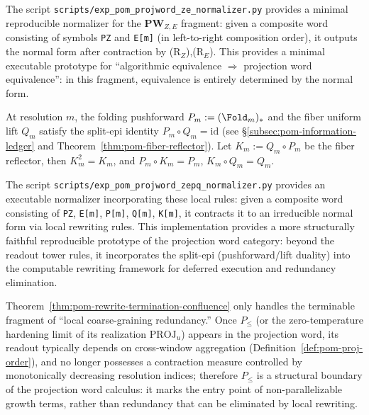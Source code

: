 \begin{remark}\label{rem:pom-projword-normalizer-script}
The script \texttt{scripts/exp\_pom\_projword\_ze\_normalizer.py} provides a minimal reproducible normalizer for the $\mathbf{PW}_{Z,E}$ fragment: given a composite word consisting of symbols \texttt{PZ} and \texttt{E[m]} (in left-to-right composition order), it outputs the normal form after contraction by (R$_Z$),(R$_E$).
This provides a minimal executable prototype for ``algorithmic equivalence \(\Rightarrow\) projection word equivalence'': in this fragment, equivalence is entirely determined by the normal form.
\end{remark}

\begin{remark}\label{rem:pom-projword-zepq-normalizer-script}
At resolution \(m\), the folding pushforward \(P_m:=(\Fold_m)_*\) and the fiber uniform lift \(Q_m\) satisfy the split-epi identity
\(
P_m\circ Q_m=\mathrm{id}
\)
(see \S\ref{subsec:pom-information-ledger} and Theorem~\ref{thm:pom-fiber-reflector}).
Let \(K_m:=Q_m\circ P_m\) be the fiber reflector, then \(K_m^2=K_m\), and \(P_m\circ K_m=P_m\), \(K_m\circ Q_m=Q_m\).
\par
The script \texttt{scripts/exp\_pom\_projword\_zepq\_normalizer.py} provides an executable normalizer incorporating these local rules: given a composite word consisting of \texttt{PZ}, \texttt{E[m]}, \texttt{P[m]}, \texttt{Q[m]}, \texttt{K[m]}, it contracts it to an irreducible normal form via local rewriting rules.
This implementation provides a more structurally faithful reproducible prototype of the projection word category: beyond the readout tower rules, it incorporates the split-epi (pushforward/lift duality) into the computable rewriting framework for deferred execution and redundancy elimination.
\end{remark}

\begin{remark}[Boundary: Order Projection \texorpdfstring{$P_{\le}$}{P<=} Does Not Belong to the Locally Cancelable Fragment]\label{rem:pom-rewrite-boundary-order}
Theorem~\ref{thm:pom-rewrite-termination-confluence} only handles the terminable fragment of ``local coarse-graining redundancy.''
Once $P_{\le}$ (or the zero-temperature hardening limit of its realization $\mathrm{PROJ}_u$) appears in the projection word, its readout typically depends on cross-window aggregation (Definition~\ref{def:pom-proj-order}), and no longer possesses a contraction measure controlled by monotonically decreasing resolution indices; therefore $P_{\le}$ is a structural boundary of the projection word calculus: it marks the entry point of non-parallelizable growth terms, rather than redundancy that can be eliminated by local rewriting.
\end{remark}


